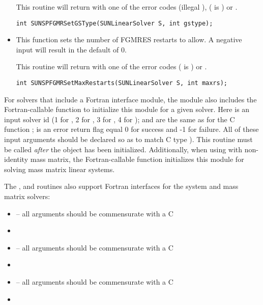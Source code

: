 \begin{itemize}
  This routine will return with one of the error codes
   (illegal ), 
  ( is ) or .
  
  \verb|int SUNSPFGMRSetGSType(SUNLinearSolver S, int gstype);|



\item {}

  This function sets the number of FGMRES restarts to 
  allow.  A negative input will result in the default of 0.

  This routine will return with one of the error codes
   ( is ) or .
  
  \verb|int SUNSPFGMRSetMaxRestarts(SUNLinearSolver S, int maxrs);|

\end{itemize}
For solvers that include a Fortran interface module, the
{\sunlinsolspfgmr} module also includes the Fortran-callable
function  to initialize
this {\sunlinsolspfgmr} module for a given {\sundials} solver.
Here  is an input solver id (1 for {\cvode}, 2 for {\ida}, 3
for {\kinsol}, 4 for {\arkode});  and  are the
same as for the C function ;  is an error return
flag equal 0 for success and -1 for failure.  All of these input
arguments should be declared so as to match C type ).  This
routine must be called \emph{after} the {\nvector} object has been
initialized.  Additionally, when using {\arkode} with non-identity
mass matrix, the Fortran-callable
function  initializes this 
{\sunlinsolspfgmr} module for solving mass matrix linear systems.

The ,  and
 routines also support Fortran interfaces
for the system and mass matrix solvers:
\begin{itemize}
\item {} -- all arguments
  should be commensurate with a C 
\item {}
\item {} -- all arguments
  should be commensurate with a C 
\item {}
\item {} -- all arguments
  should be commensurate with a C 
\item {}
\end{itemize}
